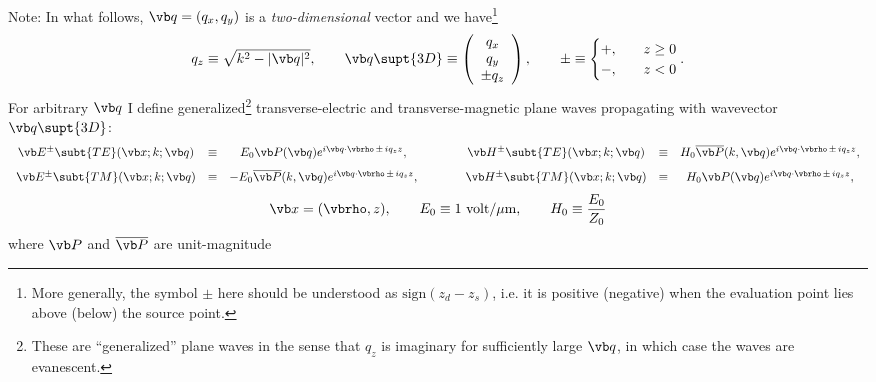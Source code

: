 \documentclass[letterpaper]{article}
\begin{document}
Note: In what follows,
$\vb q=(q_x,q_y)$ is a \textit{two-dimensional} vector and we
have\footnote{More generally, the symbol $\pm$ here should be understood
as $\text{sign}(z_d - z_s)$, i.e. it is positive (negative) when the evaluation 
point lies above (below) the source point.}
$$ q_z \equiv \sqrt{k^2 - |\vb q|^2}, 
   \qquad
   \vb q\supt{3D}\equiv
   \left(\begin{array}{c}q_x \\ q_y \\ \pm q_z \end{array}\right), 
   \qquad
   \pm \equiv
   \begin{cases}
     +, \quad & z\ge 0 \\ 
     -, \quad & z<   0
   \end{cases}.
$$
For arbitrary $\vb q$ I define generalized\footnote{These 
are ``generalized'' plane waves in the sense that $q_z$ is 
imaginary for sufficiently large $\vb q$, in which case the 
waves are evanescent.} transverse-electric and
transverse-magnetic plane waves propagating with wavevector
$\vb q\supt{3D}$:
$$\begin{array}{ccccccc}
 \vb E^{\pm} \subt{TE}(\vb x; k; \vb q)
   &\equiv& E_0 \vb P(\vb q) e^{i\vb q \cdot \vbrho \, \pm \, iq_z z},
   &\qquad&
 \vb H^{\pm} \subt{TE}(\vb x; k; \vb q)
   &\equiv& H_0 \overline{\vb P}(k, \vb q) e^{i\vb q \cdot \vbrho \, \pm \, iq_z z},
\\[8pt]
 \vb E^{\pm} \subt{TM}(\vb x; k; \vb q)
   &\equiv& -E_0 \overline{\vb P}(k,\vb q) e^{i\vb q \cdot \vbrho \, \pm \, iq_z z},
   &\qquad&
 \vb H^{\pm} \subt{TM}(\vb x; k; \vb q)
   &\equiv& H_0 \vb P(\vb q) e^{i\vb q \cdot \vbrho \, \pm \, iq_z z},
\end{array}$$
$$ \vb x=(\vbrho, z),
   \qquad
   E_0 \equiv 1 \text{ volt/$\mu$m}, \qquad H_0\equiv \frac{E_0}{Z_0}
$$
where $\vb P$ and $\overline{\vb P}$ are unit-magnitude
\end{document}
